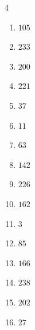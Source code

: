 \begin{multicols}{4}
\begin{enumerate}
  \item $105$


  \item $233$


  \item $200$


  \item $221$


\columnbreak %

  \item $37$


  \item $11$


  \item $63$


  \item $142$


  \item $226$


  \item $162$


  \item $3$


  \item $85$


  \item $166$


  \item $238$


  \item $202$


  \item $27$


\end{enumerate}
\end{multicols}
